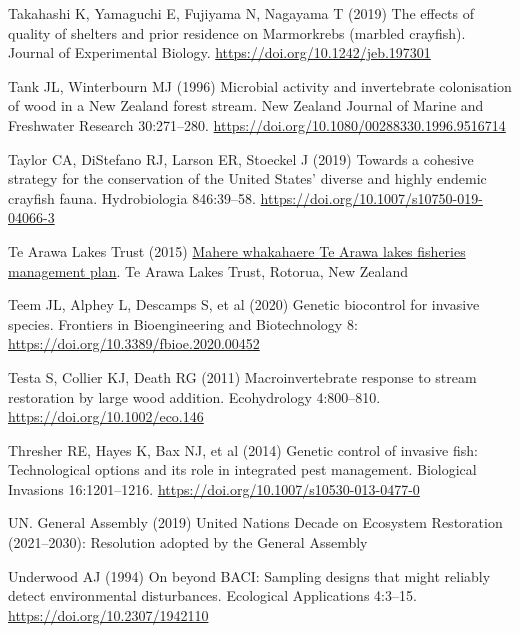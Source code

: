 \documentclass[
  12pt,
  a4paper,
  oneside]{scrbook}
\newlength{\cslhangindent}
\newenvironment{CSLReferences}[2] %
 {\begin{list}{}{%
  \setlength{\itemindent}{0pt}
  \setlength{\leftmargin}{0pt}
  \setlength{\parsep}{0pt}
  \ifodd #1
   \setlength{\leftmargin}{\cslhangindent}
   \setlength{\itemindent}{-1\cslhangindent}
  \fi
  \setlength{\itemsep}{#2\baselineskip}}}
 {\end{list}}
\renewenvironment{CSLReferences}[2]
   {\begin{list}{}{%
    \setlength{\itemindent}{0pt}
    \setlength{\leftmargin}{0pt}
    \setlength{\parsep}{0pt}
    \ifodd #1
     \setlength{\leftmargin}{\cslhangindent}
     \setlength{\itemindent}{-1\cslhangindent}
    \fi
    \setlength{\itemsep}{0.3\baselineskip}}}
   {\end{list}}%
\begin{document}
\begin{CSLReferences}{1}{1}
Takahashi K, Yamaguchi E, Fujiyama N, Nagayama T (2019) The effects of
quality of shelters and prior residence on {Marmorkrebs} (marbled
crayfish). Journal of Experimental Biology.
\url{https://doi.org/10.1242/jeb.197301}

Tank JL, Winterbourn MJ (1996) Microbial activity and invertebrate
colonisation of wood in a {New Zealand} forest stream. New Zealand
Journal of Marine and Freshwater Research 30:271--280.
\url{https://doi.org/10.1080/00288330.1996.9516714}

Taylor CA, DiStefano RJ, Larson ER, Stoeckel J (2019) Towards a cohesive
strategy for the conservation of the {United States}' diverse and highly
endemic crayfish fauna. Hydrobiologia 846:39--58.
\url{https://doi.org/10.1007/s10750-019-04066-3}

Te Arawa Lakes Trust (2015)
\href{https://tearawa.io/wp-content/uploads/2021/07/Mahere-Whakahaere-Fisheries-Management-Plan-Te-Arawa-Lakes-Trust.pdf}{Mahere
whakahaere {Te Arawa} lakes fisheries management plan}. Te Arawa Lakes
Trust, Rotorua, New Zealand

Teem JL, Alphey L, Descamps S, et al (2020) Genetic biocontrol for
invasive species. Frontiers in Bioengineering and Biotechnology 8:
\url{https://doi.org/10.3389/fbioe.2020.00452}

Testa S, Collier KJ, Death RG (2011) Macroinvertebrate response to
stream restoration by large wood addition. Ecohydrology 4:800--810.
\url{https://doi.org/10.1002/eco.146}

Thresher RE, Hayes K, Bax NJ, et al (2014) Genetic control of invasive
fish: Technological options and its role in integrated pest management.
Biological Invasions 16:1201--1216.
\url{https://doi.org/10.1007/s10530-013-0477-0}

UN. General Assembly (2019) {United Nations Decade} on {Ecosystem
Restoration} (2021--2030): Resolution adopted by the {General Assembly}

Underwood AJ (1994) On beyond {BACI}: Sampling designs that might
reliably detect environmental disturbances. Ecological Applications
4:3--15. \url{https://doi.org/10.2307/1942110}


\end{CSLReferences}
\end{document}
